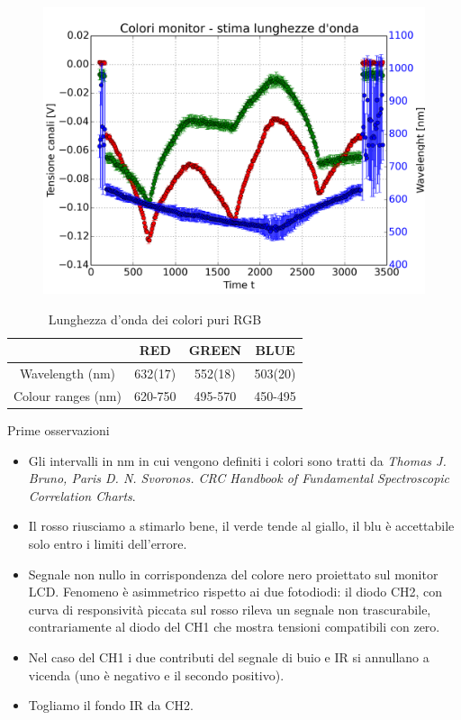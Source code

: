 \documentclass{beamer}
\begin{document}
\begin{frame}
\begin{figure}
\centering
\includegraphics[width=0.6\linewidth]{./monitor_stima_lunghezzaonda}
\label{fig:monitor_stima_lunghezzaonda}
\end{figure}

\begin{table}[h]
\centering
\begin{tabular}{c|c|c|c}
  & \textbf{RED} & \textbf{GREEN} & \textbf{BLUE} \\ 
 \hline Wavelength (nm) & 632(17) & 552(18) & 503(20) \\
 Colour ranges (nm) & 620-750 & 495-570 & 450-495 \\ 
\hline 
\end{tabular} 
\caption{Lunghezza d'onda dei colori puri RGB}
\label{RGB_lambda}
\end{table}
\end{frame}

\begin{frame}{Prime osservazioni}
\begin{itemize}
\item Gli intervalli in nm in cui vengono definiti i colori sono tratti da \textit{Thomas J. Bruno, Paris D. N. Svoronos. CRC Handbook of Fundamental Spectroscopic Correlation Charts}.
\item Il rosso riusciamo a stimarlo bene, il verde tende al giallo, il blu è accettabile solo entro i limiti dell'errore.
\item Segnale non nullo in corrispondenza del colore nero proiettato sul monitor LCD. Fenomeno è asimmetrico rispetto ai due fotodiodi: il diodo CH2, con curva di responsività piccata sul rosso rileva un segnale non trascurabile, contrariamente al diodo del CH1 che mostra tensioni compatibili con zero.
\item Nel caso del CH1 i due contributi del segnale di buio e IR si annullano a vicenda (uno è negativo e il secondo positivo).
\item Togliamo il fondo IR da CH2.
\end{itemize}
\end{frame}
\end{document}
